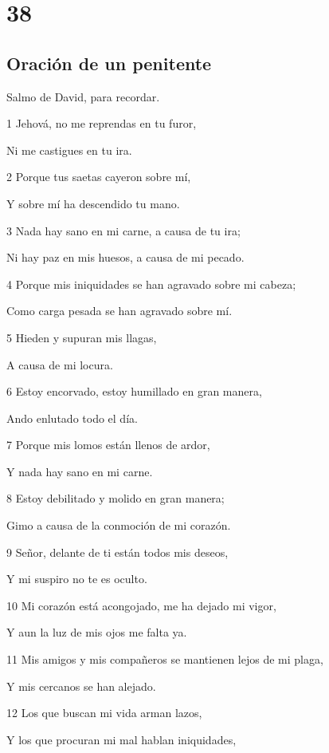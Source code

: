 \chapter{38}

\section*{Oración de un penitente}

\par Salmo de David, para recordar.

\par 1 Jehová, no me reprendas en tu furor,
\par Ni me castigues en tu ira.
\par 2 Porque tus saetas cayeron sobre mí,
\par Y sobre mí ha descendido tu mano.
\par 3 Nada hay sano en mi carne, a causa de tu ira;
\par Ni hay paz en mis huesos, a causa de mi pecado.
\par 4 Porque mis iniquidades se han agravado sobre mi cabeza;
\par Como carga pesada se han agravado sobre mí.
\par 5 Hieden y supuran mis llagas,
\par A causa de mi locura.
\par 6 Estoy encorvado, estoy humillado en gran manera,
\par Ando enlutado todo el día.
\par 7 Porque mis lomos están llenos de ardor,
\par Y nada hay sano en mi carne.
\par 8 Estoy debilitado y molido en gran manera;
\par Gimo a causa de la conmoción de mi corazón.
\par 9 Señor, delante de ti están todos mis deseos,
\par Y mi suspiro no te es oculto.
\par 10 Mi corazón está acongojado, me ha dejado mi vigor,
\par Y aun la luz de mis ojos me falta ya.
\par 11 Mis amigos y mis compañeros se mantienen lejos de mi plaga,
\par Y mis cercanos se han alejado.
\par 12 Los que buscan mi vida arman lazos,
\par Y los que procuran mi mal hablan iniquidades,
